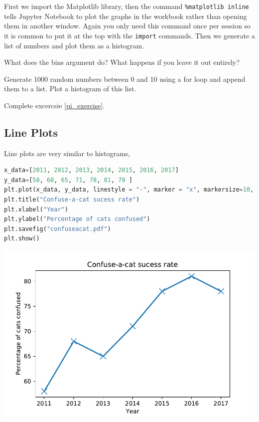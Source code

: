 		First we import the Matplotlib library, then the command \texttt{\%matplotlib inline} tells Jupyter Notebook to plot the graphs in the workbook rather than opening them in another window. Again you only need this command once per session so it is common to put it at the top with the \texttt{import} commands. Then we generate a list of numbers and plot them as a histogram.
		\begin{task}What does the bins argument do? What happens if you leave it out entirely?\end{task}
		\begin{task}Generate 1000 random numbers between 0 and 10 using a for loop and append them to a list. Plot a histogram of this list.\end{task}
		\begin{task}Complete excercsie \ref{pi_exercise}.\end{task}

	\subsection{Line Plots}
		Line plots are very similar to histograms,
		\begin{lstlisting}[language=Python]
x_data=[2011, 2012, 2013, 2014, 2015, 2016, 2017]
y_data=[58, 68, 65, 71, 78, 81, 78 ]
plt.plot(x_data, y_data, linestyle = "-", marker = "x", markersize=10, linewidth=2)
plt.title("Confuse-a-cat sucess rate")
plt.xlabel("Year")
plt.ylabel("Percentage of cats confused")
plt.savefig("confuseacat.pdf")
plt.show()\end{lstlisting}
		\includegraphics[scale=0.8]{images/confuseacat}

